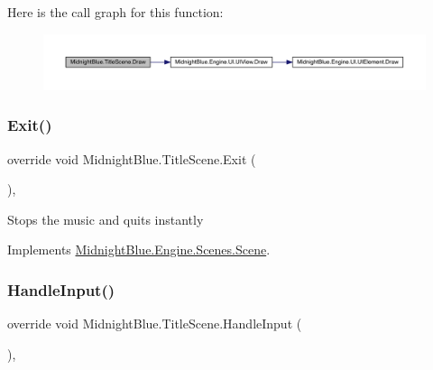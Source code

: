 Here is the call graph for this function\+:
\nopagebreak
\begin{figure}[H]
\begin{center}
\leavevmode
\includegraphics[width=350pt]{class_midnight_blue_1_1_title_scene_a03fa806a36226ec5fd0ce09870109c18_cgraph}
\end{center}
\end{figure}
\hypertarget{class_midnight_blue_1_1_title_scene_aed29e37e9f849cc8f8443bae057a8eb8}{}\label{class_midnight_blue_1_1_title_scene_aed29e37e9f849cc8f8443bae057a8eb8} 
\subsubsection{\texorpdfstring{Exit()}{Exit()}}
{\footnotesize\ttfamily override void Midnight\+Blue.\+Title\+Scene.\+Exit (\begin{DoxyParamCaption}{ }\end{DoxyParamCaption})\hspace{0.3cm}{\ttfamily [inline]}, {\ttfamily [virtual]}}



Stops the music and quits instantly 



Implements \hyperlink{class_midnight_blue_1_1_engine_1_1_scenes_1_1_scene_adbf0f6d758df9fc5e20f24f327599e67}{Midnight\+Blue.\+Engine.\+Scenes.\+Scene}.

\hypertarget{class_midnight_blue_1_1_title_scene_a54dc02f150eb90dac2fcc6e37a077723}{}\label{class_midnight_blue_1_1_title_scene_a54dc02f150eb90dac2fcc6e37a077723} 
\subsubsection{\texorpdfstring{Handle\+Input()}{HandleInput()}}
{\footnotesize\ttfamily override void Midnight\+Blue.\+Title\+Scene.\+Handle\+Input (\begin{DoxyParamCaption}{ }\end{DoxyParamCaption})\hspace{0.3cm}{\ttfamily [inline]}, {\ttfamily [virtual]}}



